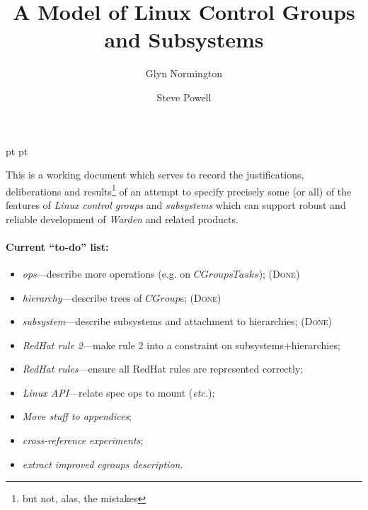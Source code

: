 \documentclass[a4paper,twoside,12pt]{article}
\begin{document}
 pt
 pt

\def\Slash{\slash\hspace{0pt}}

\title{A Model of Linux Control Groups and Subsystems}

\author{
Glyn Normington\and
Steve Powell
}

\maketitle
\thispagestyle{myheadings}
\setcounter{page}{1}


This is a working document which serves to record the justifications, deliberations and results\footnote{but 
not, alas, the mistakes} of an attempt to
specify precisely some (or all) of the features of \emph{Linux control groups} and \emph{subsystems} which can support robust and reliable development of \emph{Warden} and related products.

\paragraph{Current ``to-do'' list:}
\begin{itemize}
\item \emph{ops}---describe more operations (e.g. on $CGroupsTasks$); (\textsc{Done})
\item \emph{hierarchy}---describe trees of $CGroup$s; (\textsc{Done})
\item \emph{subsystem}---describe subsystems and attachment to hierarchies; (\textsc{Done})
\item \emph{RedHat rule 2}---make rule 2 into a constraint on subsystems+hierarchies;
\item \emph{RedHat rules}---ensure all RedHat rules are represented correctly;
\item \emph{Linux API}---relate spec ops to mount (\emph{etc.});
\item \emph{Move stuff to appendices};
\item \emph{cross-reference experiments};
\item \emph{extract improved cgroups description}.
\end{itemize}
\end{document}
